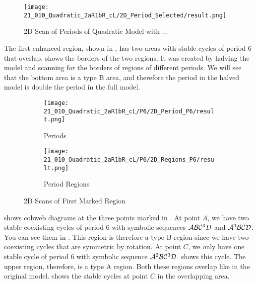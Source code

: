 \begin{figure}
	\centering
	\texttt{[image: 21\_010\_Quadratic\_2aR1bR\_cL/2D\_Period\_Selected/result.png]}
	\caption{2D Scan of Periods of Quadratic Model with ...}
	\label{fig:quadratic.full.2aR1bR_cL.2d.full}
\end{figure}

The first enhanced region, shown in , has two areas with stable cycles of period 6 that overlap.
 shows the borders of the two regions.
It was created by halving the model and scanning for the borders of regions of different periods.
We will see that the bottom area is a type B area, and therefore the period in the halved model is double the period in the full model.

\begin{figure}
	\centering
	\begin{subfigure}{0.4\textwidth}
		\centering
		\texttt{[image: 21\_010\_Quadratic\_2aR1bR\_cL/P6/2D\_Period\_P6/result.png]}
		\caption{Periods}
		\label{fig:quadratic.full.2aR1bR_cL.2d.1}
	\end{subfigure}
	\begin{subfigure}{0.4\textwidth}
		\centering
		\texttt{[image: 21\_010\_Quadratic\_2aR1bR\_cL/P6/2D\_Regions\_P6/result.png]}
		\caption{Period Regions}
		\label{fig:quadratic.regions.2aR1bR_cL.2d.1}
	\end{subfigure}
	\caption{2D Scans of First Marked Region}
\end{figure}

 shows cobweb diagrams at the three points marked in .
At point $A$, we have two stable coexisting cycles of period 6 with symbolic sequences $\mathcal{A}\mathcal{B}\mathcal{C}^3D$ and $\mathcal{A}^3\mathcal{B}\mathcal{C}\mathcal{D}$.
You can see them in .
This region is therefore a type B region since we have two coexisting cycles that are symmetric by rotation.
At point $C$, we only have one stable cycle of period 6 with symbolic sequence $\mathcal{A}^2\mathcal{B}\mathcal{C}^3\mathcal{D}$.
 shows this cycle.
The upper region, therefore, is a type A region.
Both these regions overlap like in the original model.
 shows the stable cycles at point $C$ in the overlapping area.

